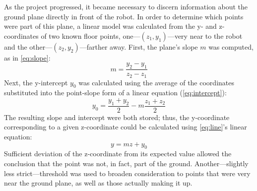\documentclass[12pt]{report}
\begin{document}
As the project progressed, it became necessary to discern information about the ground plane directly in front of the robot.  In order to determine which points were part of this plane, a linear model was calculated from the y- and z-coordinates of two known floor points, one---$(z_1,y_1)$---very near to the robot and the other---$(z_2,y_2)$---farther away.  First, the plane's slope $m$ was computed, as in \autoref{eq:slope}:
\begin{equation}
\label{eq:slope}
m=\frac{y_2-y_1}{z_2-z_1}
\end{equation}
Next, the y-intercept $y_0$ was calculated using the average of the coordinates substituted into the point-slope form of a linear equation (\autoref{eq:intercept}):
\begin{equation}
\label{eq:intercept}
y_0=\frac{y_1+y_2}{2}-m\frac{z_1+z_2}{2}
\end{equation}
The resulting slope and intercept were both stored; thus, the y-coordinate corresponding to a given z-coordinate could be calculated using \autoref{eq:line}'s linear equation:
\begin{equation}
\label{eq:line}
y=mz+y_0
\end{equation}
Sufficient deviation of the z-coordinate from its expected value allowed the conclusion that the point was not, in fact, part of the ground.  Another---slightly less strict---threshold was used to broaden consideration to points that were very near the ground plane, as well as those actually making it up.
\end{document}
